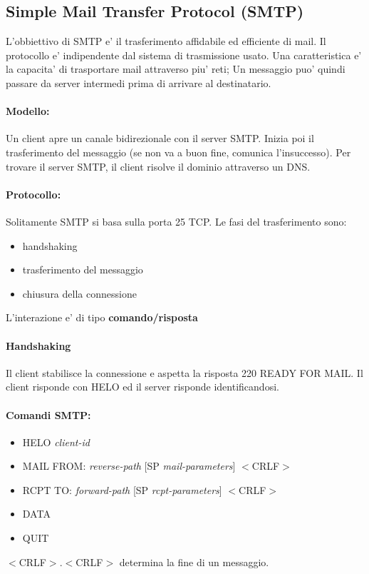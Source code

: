 \subsection{Simple Mail Transfer Protocol (SMTP)}
L'obbiettivo di SMTP e' il trasferimento affidabile ed efficiente di mail.
Il protocollo e' indipendente dal sistema di trasmissione usato.
Una caratteristica e' la capacita' di trasportare mail attraverso piu' reti; Un messaggio puo' quindi passare da server intermedi prima di arrivare al destinatario.

\paragraph{Modello: }
Un client apre un canale bidirezionale con il server SMTP. Inizia poi il trasferimento del messaggio (se non va a buon fine, comunica l'insuccesso).
Per trovare il server SMTP, il client risolve il dominio attraverso un DNS.

\paragraph{Protocollo: }
Solitamente SMTP si basa sulla porta 25 TCP.
Le fasi del trasferimento sono:
\begin{itemize}
    \item handshaking
    \item trasferimento del messaggio
    \item chiusura della connessione
\end{itemize}
L'interazione e' di tipo \textbf{comando/risposta}

\paragraph{Handshaking} Il client stabilisce la connessione e aspetta la risposta 220 READY FOR MAIL. Il client risponde con HELO ed il server risponde identificandosi.
\paragraph{Comandi SMTP:}
\begin{itemize}
    \item HELO \textit{client-id}
    \item MAIL FROM: \textit{reverse-path} [SP \textit{mail-parameters}] $<$CRLF$>$
    \item RCPT TO: \textit{forward-path} [SP \textit{rcpt-parameters}] $<$CRLF$>$
    \item DATA
    \item QUIT
\end{itemize}
$<$CRLF$>$.$<$CRLF$>$ determina la fine di un messaggio.

